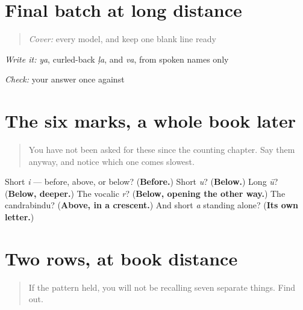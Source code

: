 \section[\texorpdfstring{\mr{य} / \mr{ळ} / \mr{व} (ya / lla / va)}{य / ळ / व (ya / lla / va)}]{Final batch at long distance}

\label{lesson:MR-R18-script-d-r4}



\begin{quote}
\emph{Cover:} every model, and keep one blank line ready
\end{quote}

\begin{tcolorbox}[breakable,colback=teal!4,colframe=teal!35!black,title={Before you move on}]
\emph{Write it:} \emph{ya}, curled-back \emph{ḷa}, and \emph{va}, from spoken names only

\emph{Check:} your answer once against \textbf{  }
\end{tcolorbox}
\section[six marks (sahā khuṇā)]{The six marks, a whole book later}

\label{lesson:MR-R22-marks-r4}



\begin{quote}
You have not been asked for these since the counting chapter. Say them anyway, and notice which one comes slowest.
\end{quote}

\begin{tcolorbox}[breakable,colback=teal!4,colframe=teal!35!black,title={Before you move on}]
Short \emph{i} — before, above, or below? (\textbf{Before.}) Short \emph{u}? (\textbf{Below.}) Long \emph{ū}? (\textbf{Below, deeper.}) The vocalic \emph{r}? (\textbf{Below, opening the other way.}) The candrabindu? (\textbf{Above, in a crescent.}) And short \emph{a} standing alone? (\textbf{Its own letter.})
\end{tcolorbox}
\section[two rows (don olī)]{Two rows, at book distance}

\label{lesson:MR-R22-two-rows-r4}



\begin{quote}
If the pattern held, you will not be recalling seven separate things. Find out.
\end{quote}


